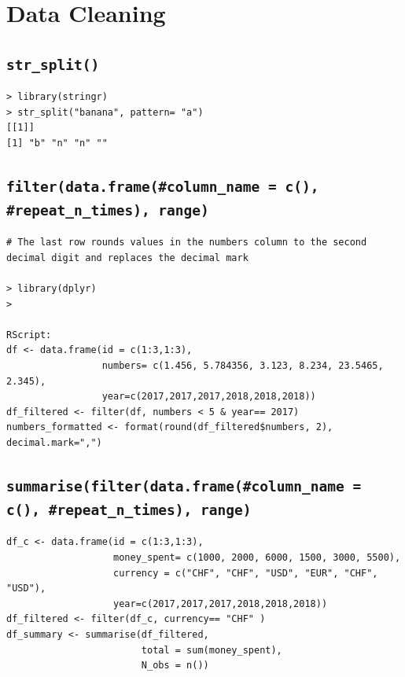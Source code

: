 \documentclass[10pt,a4paper]{article}
\begin{document}
\section{Data Cleaning}

\subsection*{\texttt{str\_split()}}

\begin{lstlisting}
> library(stringr)
> str_split("banana", pattern= "a")
[[1]]
[1] "b" "n" "n" "" 
\end{lstlisting}

\subsection*{\texttt{filter(data.frame(\#column\_name = c(), \#repeat\_n\_times), range)}}

\begin{lstlisting}
# The last row rounds values in the numbers column to the second decimal digit and replaces the decimal mark 

> library(dplyr)
>

RScript:
df <- data.frame(id = c(1:3,1:3),
                 numbers= c(1.456, 5.784356, 3.123, 8.234, 23.5465, 2.345),
                 year=c(2017,2017,2017,2018,2018,2018))
df_filtered <- filter(df, numbers < 5 & year== 2017)
numbers_formatted <- format(round(df_filtered$numbers, 2), decimal.mark=",")
\end{lstlisting}

\subsection*{\texttt{summarise(filter(data.frame(\#column\_name = c(), \#repeat\_n\_times), range)}}

\begin{lstlisting}
df_c <- data.frame(id = c(1:3,1:3),
                   money_spent= c(1000, 2000, 6000, 1500, 3000, 5500),
                   currency = c("CHF", "CHF", "USD", "EUR", "CHF", "USD"),
                   year=c(2017,2017,2017,2018,2018,2018))
df_filtered <- filter(df_c, currency== "CHF" )
df_summary <- summarise(df_filtered,
                        total = sum(money_spent),
                        N_obs = n())
\end{lstlisting}
			
\vspace{1em}
\end{document}
